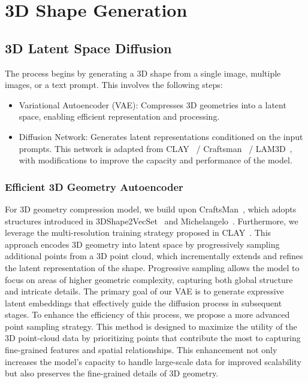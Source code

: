 \section{3D Shape Generation}
\label{sec:3dshape}

\subsection{3D Latent Space Diffusion} %
The process begins by generating a 3D shape from a single image, multiple images, or a text prompt. This involves the following steps:
\begin{itemize}
    \item Variational Autoencoder (VAE): Compresses 3D geometries into a latent space, enabling efficient representation and processing.
    \item Diffusion Network: Generates latent representations conditioned on the input prompts. This network is adapted from CLAY~\cite{zhang2024clay} / Craftsman~\cite{li2024craftsman} / LAM3D~\cite{cui2024lam3d}, with modifications to improve the capacity and performance of the model. %
\end{itemize}

\subsubsection{Efficient 3D Geometry Autoencoder}
For 3D geometry compression model, we build upon CraftsMan~\cite{li2024craftsman}, which adopts structures introduced in  
3DShape2VecSet~\cite{zhang20233dshape2vecset} and Michelangelo~\cite{zhao2024michelangelo}. 
Furthermore, we leverage the multi-resolution training strategy proposed in CLAY~\cite{zhang2024clay}. 
This approach encodes 3D geometry into latent space by progressively sampling additional points from a 3D point cloud, which incrementally extends and refines the latent representation of the shape. Progressive sampling allows the model to focus on areas of higher geometric complexity, capturing both global structure and intricate details.
The primary goal of our VAE is to generate expressive latent embeddings that effectively guide the diffusion process in subsequent stages. To enhance the efficiency of this process, we propose a more advanced point sampling strategy. This method is designed to maximize the utility of the 3D point-cloud data by prioritizing points that contribute the most to capturing fine-grained features and spatial relationships.
This enhancement not only increases the model's capacity to handle large-scale data for improved scalability but also preserves the fine-grained details of 3D geometry.

